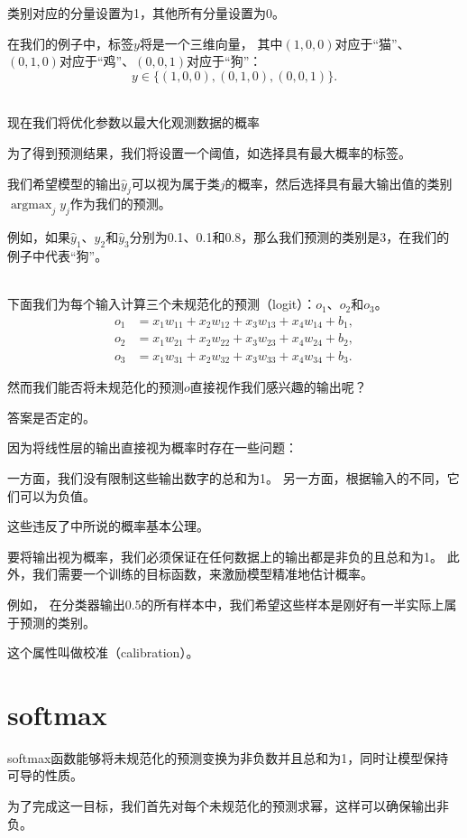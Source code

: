 \documentclass[openany,11pt]{book}
\begin{document}
类别对应的分量设置为1，其他所有分量设置为0。

在我们的例子中，标签$y$将是一个三维向量，
其中$(1, 0, 0)$对应于“猫”、$(0, 1, 0)$对应于“鸡”、$(0, 0, 1)$对应于“狗”：
$$y \in \{(1, 0, 0), (0, 1, 0), (0, 0, 1)\}.$$


~\\
{\color{red} 现在我们将优化参数以最大化观测数据的概率}

为了得到预测结果，我们将设置一个阈值，如选择具有最大概率的标签。

我们希望模型的输出$\hat{y}_j$可以视为属于类$j$的概率，然后选择具有最大输出值的类别$\operatorname{argmax}_j y_j$作为我们的预测。

例如，如果$\hat{y}_1$、$\hat{y}_2$和$\hat{y}_3$分别为0.1、0.1和0.8，那么我们预测的类别是3，在我们的例子中代表“狗”。


~\\
下面我们为每个输入计算三个未规范化的预测（logit）：$o_1$、$o_2$和$o_3$。
$$
\begin{aligned}
	o_1 &= x_1 w_{11} + x_2 w_{12} + x_3 w_{13} + x_4 w_{14} + b_1,\\
	o_2 &= x_1 w_{21} + x_2 w_{22} + x_3 w_{23} + x_4 w_{24} + b_2,\\
	o_3 &= x_1 w_{31} + x_2 w_{32} + x_3 w_{33} + x_4 w_{34} + b_3.
\end{aligned}
$$

然而我们能否将未规范化的预测$o$直接视作我们感兴趣的输出呢？

答案是否定的。

因为将线性层的输出直接视为概率时存在一些问题：

一方面，我们没有限制这些输出数字的总和为1。
另一方面，根据输入的不同，它们可以为负值。

这些违反了中所说的概率基本公理。

要将输出视为概率，我们必须保证在任何数据上的输出都是非负的且总和为1。
此外，我们需要一个训练的目标函数，来激励模型精准地估计概率。

例如，
在分类器输出0.5的所有样本中，我们希望这些样本是刚好有一半实际上属于预测的类别。

这个属性叫做校准（calibration）。


\section{softmax}

softmax函数能够将未规范化的预测变换为非负数并且总和为1，同时让模型保持
可导的性质。

为了完成这一目标，我们首先对每个未规范化的预测求幂，这样可以确保输出非负。
\end{document}
